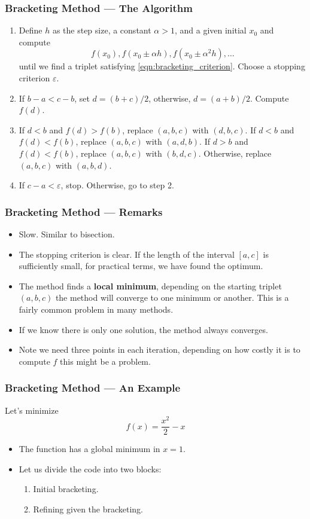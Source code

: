 \documentclass[11pt,xcolor={svgnames},aspectratio=169,usepdftitle=false,notheorems]{beamer}
\begin{document}
\begin{frame}
  \frametitle{Bracketing Method --- The Algorithm}
\begin{enumerate}
  \item Define $h$ as the step size, a constant $\alpha > 1$, and a given initial $x_0$ and compute
  \[
  f(x_0), f(x_0 \pm \alpha h), f(x_0 \pm \alpha^2 h), \ldots
  \]
  until we find a triplet satisfying \eqref{eqn:bracketing_criterion}. Choose a stopping criterion $\varepsilon$.
  \item If $b - a < c - b$, set $d = (b+c)/2$, otherwise, $d = (a+b) / 2$. Compute $f(d)$.
  \item If $d < b$ and $f(d) > f(b)$, replace $(a,b,c)$ with $(d,b,c)$. If $d<b$ and $f(d) < f(b)$, replace $(a,b,c)$ with $(a,d,b)$. If $d > b$ and $f(d) < f(b)$, replace $(a,b,c)$ with $(b,d,c)$.  Otherwise, replace $(a,b,c)$ with $(a,b,d)$.
  \item If $c - a < \varepsilon$, stop. Otherwise, go to step 2.
\end{enumerate}
\end{frame}

\begin{frame}
  \frametitle{Bracketing Method --- Remarks}
\begin{itemize}
  \item Slow. Similar to bisection.
  \item The stopping criterion is clear. If the length of the interval $[a,c]$ is sufficiently small, for practical terms, we have found the optimum.
  \item The method finds a \alert{\textbf{local minimum}}, depending on the starting triplet $(a,b,c)$ the method will converge to one minimum or another. {\tiny This is a fairly common problem in many methods.}
  \item If we know there is only one solution, the method always converges.
  \item Note we need three points in each iteration, depending on how costly it is to compute $f$ this might be a problem.
\end{itemize}
\end{frame}

\begin{frame}
  \frametitle{Bracketing Method --- An Example}
Let's minimize
\[
f(x) = \frac{x^2}{2} - x
\]
\begin{itemize}
  \item The function has a global minimum in $x = 1$.
  \item Let us divide the code into two blocks:
  \begin{enumerate}
    \item Initial bracketing.
    \item Refining given the bracketing.
  \end{enumerate}
\end{itemize}
\end{frame}
\end{document}
